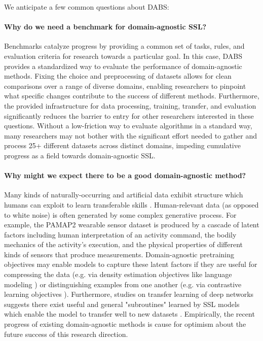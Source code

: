 \documentclass{article}
\begin{document}
We anticipate a few common questions about DABS:


\paragraph{Why do we need a benchmark for domain-agnostic SSL?}

Benchmarks catalyze progress by providing a common set of tasks, rules, and evaluation criteria for research towards a particular goal.  In this case, DABS provides a standardized way to evaluate the performance of domain-agnostic methods. Fixing the choice and preprocessing of datasets allows for clean comparisons over a range of diverse domains, enabling researchers to pinpoint what specific changes contribute to the success of different methods. Furthermore, the provided infrastructure for data processing, training, transfer, and evaluation significantly reduces the barrier to entry for other researchers interested in these questions. Without a low-friction way to evaluate algorithms in a standard way, many researchers may not bother with the significant effort needed to gather and process 25+ different datasets across distinct domains, impeding cumulative progress as a field towards domain-agnostic SSL.

\paragraph{Why might we expect there to be a good domain-agnostic method?}

Many kinds of naturally-occurring and artificial data exhibit structure which humans can exploit to learn transferable skills  \citep{Carey2004OnTO, spelke2007core, Bonawitz2011TheDS, Dubey2018InvestigatingHP}. Human-relevant data (as opposed to white noise) is often generated by some complex generative process. For example, the PAMAP2 wearable sensor dataset \citep{Reiss2012IntroducingAN} is produced by a cascade of latent factors including human interpretation of an activity command, the bodily mechanics of the activity's execution, and the physical properties of different kinds of sensors that produce measurements. Domain-agnostic pretraining objectives may enable models to capture these latent factors if they are useful for compressing the data (e.g. via density estimation objectives like language modeling \citep{Shin2006AMT}) or distinguishing examples from one another (e.g. via contrastive learning objectives \citep{Hadsell2006DimensionalityRB}).  Furthermore, studies on transfer learning of deep networks suggests there exist useful and general "subroutines" learned by SSL models which enable the model to transfer well to new datasets \citep{Yosinski2014HowTA, Tamkin2020InvestigatingTI}.  Empirically, the recent progress of existing domain-agnostic methods \citep{Tamkin2020ViewmakerNL, Lee2021iMIXAD, Verma2020TowardsDC} is cause for optimism about the future success of this research direction.
\end{document}
